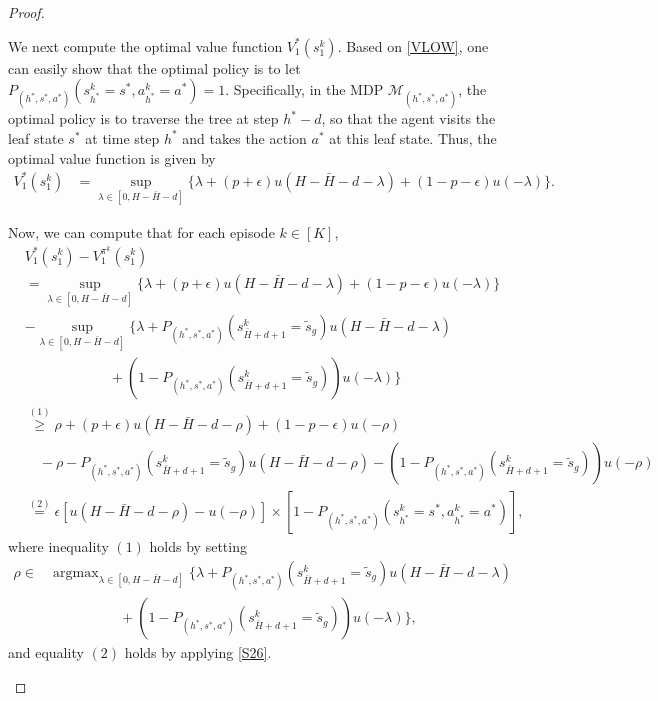 \documentclass[11pt]{article}
\newcommand{\1}{\mathbbm{1}}
\begin{document}
\begin{proof}
\begin{itemize}
We next compute the optimal value function $V_1^{*}(s_1^k)$. Based on \eqref{VLOW}, one can easily show that the optimal policy is to let $P_{(h^*,s^*,a^*)}(s_{h^*}^k=s^*,a_{h^*}^k=a^*)=1$. Specifically, in the MDP $\mathcal{M}_{(h^*,s^*,a^*)}$, the optimal policy is to traverse the tree at step $h^*-d$, so that the agent visits the leaf state $s^*$ at time step $h^*$ and takes the action $a^*$ at this leaf state. Thus, the optimal value function is given by
\begin{align*}
V_1^{*}(s_1^k)&=\sup_{\lambda\in [0,H-\bar{H}-d]}\{\lambda+(p+\epsilon)u(H-\bar{H}-d-\lambda)+(1-p-\epsilon)u(-\lambda)\}.
\end{align*}

Now, we can compute that for each episode $k\in [K]$,
\begin{align*}
&V_1^*(s_1^k)-V_1^{\pi^k}(s_1^k)\\
&=\sup_{\lambda\in [0,H-\bar{H}-d]}\{\lambda+(p+\epsilon)u(H-\bar{H}-d-\lambda)+(1-p-\epsilon)u(-\lambda)\}\\
&-\sup_{\lambda\in [0,H-\bar{H}-d]}\{\lambda+P_{(h^*,s^*,a^*)}(s^k_{\bar{H}+d+1}=\tilde{s}_g)u(H-\bar{H}-d-\lambda)\\
&\quad \quad \quad \quad \quad \quad +(1-P_{(h^*,s^*,a^*)}(s^k_{\bar{H}+d+1}=\tilde{s}_g))u(-\lambda)\}\\
&\overset{(1)}{\geq} \rho+(p+\epsilon)u(H-\bar{H}-d-\rho)+(1-p-\epsilon)u(-\rho)\\
&\quad -\rho-P_{(h^*,s^*,a^*)}(s^k_{\bar{H}+d+1}=\tilde{s}_g)u(H-\bar{H}-d-\rho)-(1-P_{(h^*,s^*,a^*)}(s^k_{\bar{H}+d+1}=\tilde{s}_g))u(-\rho)\\
&\overset{(2)}{=} \epsilon [u(H-\bar{H}-d-\rho)-u(-\rho)]\times [1-P_{(h^*,s^*,a^*)}(s_{h^*}^k=s^*,a_{h^*}^k=a^*)],
\end{align*}
where inequality $(1)$ holds by setting 
\begin{align}
\rho\in &\mathop{\arg\max}_{\lambda\in [0,H-\bar{H}-d]}\{\lambda+P_{(h^*,s^*,a^*)}(s^k_{\bar{H}+d+1}=\tilde{s}_g)u(H-\bar{H}-d-\lambda)\nonumber\\
&\quad \quad \quad \quad \quad +(1-P_{(h^*,s^*,a^*)}(s^k_{\bar{H}+d+1}=\tilde{s}_g))u(-\lambda)\},\label{eq:rho}
\end{align}
and equality $(2)$ holds by applying \eqref{S26}. %


\end{itemize}
\end{proof}
\end{document}
